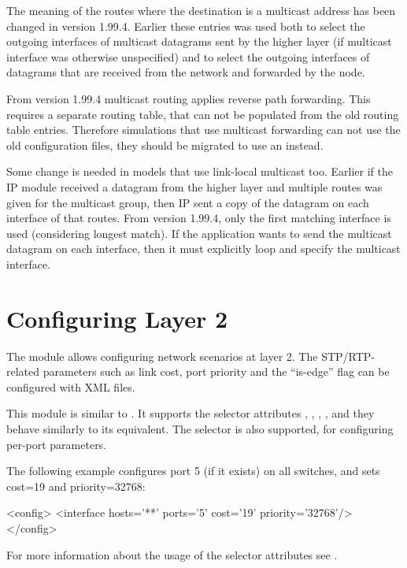 \begin{important}
The meaning of the routes where the destination is a multicast address
has been changed in version 1.99.4. Earlier these entries was used
both to select the outgoing interfaces of multicast datagrams
sent by the higher layer (if multicast interface was otherwise unspecified)
and to select the outgoing interfaces of datagrams that are received from
the network and forwarded by the node.

From version 1.99.4 multicast routing applies reverse path forwarding.
This requires a separate routing table, that can not be populated from
the old routing table entries. Therefore simulations that use multicast
forwarding can not use the old configuration files, they should be
migrated to use an  instead.

Some change is needed in models that use link-local multicast too.
Earlier if the IP module received a datagram from the higher layer
and multiple routes was given for the multicast group,
then IP sent a copy of the datagram on each interface of that routes.
From version 1.99.4, only the first matching interface is used (considering
longest match). If the application wants to send the multicast datagram
on each interface, then it must explicitly loop and specify the multicast
interface.
\end{important}



\section{Configuring Layer 2}
\label{sec:autoconfig:configuring-layer-2}

The  module allows configuring network scenarios at layer 2.
The STP/RTP-related parameters such as link cost, port priority
and the ``is-edge'' flag can be configured with XML files.

This module is similar to . It supports
the selector attributes , , , ,
and they behave similarly to its  equivalent.
The  selector is also supported, for configuring per-port parameters.

The following example configures port 5 (if it exists) on all switches,
and sets cost=19 and priority=32768:

\begin{XML}
<config>
  <interface hosts='**' ports='5' cost='19' priority='32768'/>
</config>
\end{XML}

For more information about the usage of the selector attributes see
.





